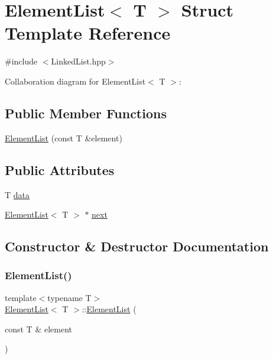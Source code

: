 \hypertarget{struct_element_list}{}\section{Element\+List$<$ T $>$ Struct Template Reference}
\label{struct_element_list}


{\ttfamily \#include $<$Linked\+List.\+hpp$>$}



Collaboration diagram for Element\+List$<$ T $>$\+:
\subsection*{Public Member Functions}
\begin{DoxyCompactItemize}
\item 
\mbox{\hyperlink{struct_element_list_a2f2c3bfdd0cda10f2e50f8f04758b52a}{Element\+List}} (const T \&element)
\end{DoxyCompactItemize}
\subsection*{Public Attributes}
\begin{DoxyCompactItemize}
\item 
T \mbox{\hyperlink{struct_element_list_a4c3bbe183d5a854d51e193b21075c884}{data}}
\item 
\mbox{\hyperlink{struct_element_list}{Element\+List}}$<$ T $>$ $\ast$ \mbox{\hyperlink{struct_element_list_ae15f34d3109949237cf3ba98a074d402}{next}}
\end{DoxyCompactItemize}


\subsection{Constructor \& Destructor Documentation}
\mbox{\label{struct_element_list_a2f2c3bfdd0cda10f2e50f8f04758b52a}} 
\subsubsection{\texorpdfstring{Element\+List()}{ElementList()}}
{\footnotesize\ttfamily template$<$typename T$>$ \\
\mbox{\hyperlink{struct_element_list}{Element\+List}}$<$ T $>$\+::\mbox{\hyperlink{struct_element_list}{Element\+List}} (\begin{DoxyParamCaption}\item[{const T \&}]{element }\end{DoxyParamCaption})\hspace{0.3cm}{\ttfamily [inline]}}



